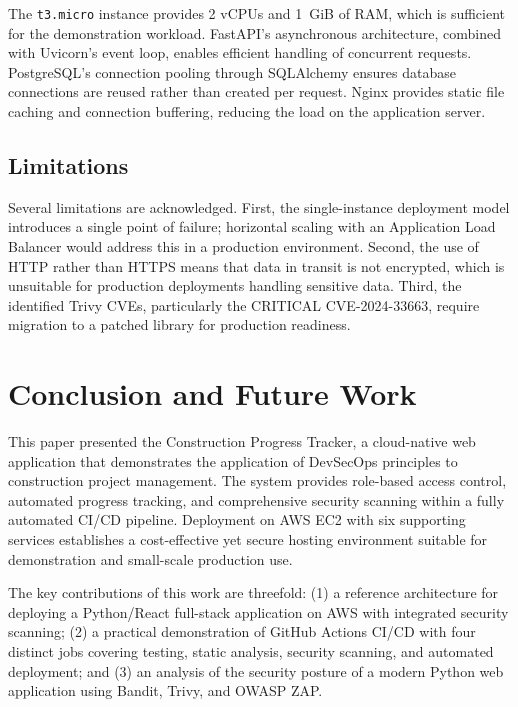 \documentclass[conference]{IEEEtran}
\begin{document}
The \texttt{t3.micro} instance provides 2 vCPUs and 1~GiB of RAM, which is sufficient for the demonstration workload. FastAPI's asynchronous architecture, combined with Uvicorn's event loop, enables efficient handling of concurrent requests. PostgreSQL's connection pooling through SQLAlchemy ensures database connections are reused rather than created per request. Nginx provides static file caching and connection buffering, reducing the load on the application server.

\subsection{Limitations}

Several limitations are acknowledged. First, the single-instance deployment model introduces a single point of failure; horizontal scaling with an Application Load Balancer would address this in a production environment. Second, the use of HTTP rather than HTTPS means that data in transit is not encrypted, which is unsuitable for production deployments handling sensitive data. Third, the identified Trivy CVEs, particularly the CRITICAL CVE-2024-33663, require migration to a patched library for production readiness.

\section{Conclusion and Future Work}
\label{sec:conclusion}

This paper presented the Construction Progress Tracker, a cloud-native web application that demonstrates the application of DevSecOps principles to construction project management. The system provides role-based access control, automated progress tracking, and comprehensive security scanning within a fully automated CI/CD pipeline. Deployment on AWS EC2 with six supporting services establishes a cost-effective yet secure hosting environment suitable for demonstration and small-scale production use.

The key contributions of this work are threefold: (1) a reference architecture for deploying a Python/React full-stack application on AWS with integrated security scanning; (2) a practical demonstration of GitHub Actions CI/CD with four distinct jobs covering testing, static analysis, security scanning, and automated deployment; and (3) an analysis of the security posture of a modern Python web application using Bandit, Trivy, and OWASP ZAP.
\end{document}
